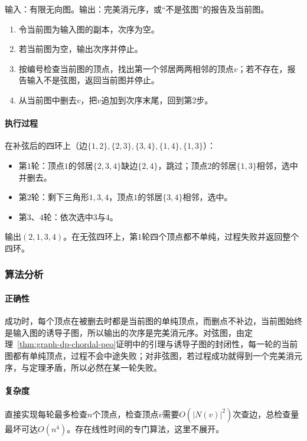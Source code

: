 \begin{algorithm}[逐次删除单纯顶点]
\label{alg:graph-dp-peo-construction}
输入：有限无向图。输出：完美消元序，或“不是弦图”的报告及当前图。
\begin{enumerate}
  \item 令当前图为输入图的副本，次序为空。
  \item 若当前图为空，输出次序并停止。
  \item 按编号检查当前图的顶点，找出第一个邻居两两相邻的顶点$v$；若不存在，报告输入不是弦图，返回当前图并停止。
  \item 从当前图中删去$v$，把$v$追加到次序末尾，回到第2步。
\end{enumerate}
\end{algorithm}

\paragraph{执行过程}
在补弦后的四环上（边$\{1,2\},\allowbreak\{2,3\},\allowbreak\{3,4\},\allowbreak\{1,4\},\allowbreak\{1,3\}$）：
\begin{itemize}
  \item 第$1$轮：顶点$1$的邻居$\{2,3,4\}$缺边$\{2,4\}$，跳过；顶点$2$的邻居$\{1,3\}$相邻，选中并删去。
  \item 第$2$轮：剩下三角形$1,3,4$，顶点$1$的邻居$\{3,4\}$相邻，选中。
  \item 第$3$、$4$轮：依次选中$3$与$4$。
\end{itemize}
输出$(2,1,3,4)$。在无弦四环上，第$1$轮四个顶点都不单纯，过程失败并返回整个四环。

\subsubsection{算法分析}

\paragraph{正确性}
成功时，每个顶点在被删去时都是当前图的单纯顶点，而删点不补边，当前图始终是输入图的诱导子图，所以输出的次序是完美消元序。对弦图，由定理~\ref{thm:graph-dp-chordal-peo}证明中的引理与诱导子图的封闭性，每一轮的当前图都有单纯顶点，过程不会中途失败；对非弦图，若过程成功就得到一个完美消元序，与定理矛盾，所以必然在某一轮失败。

\paragraph{复杂度}
直接实现每轮最多检查$n$个顶点，检查顶点$v$需要$O(|N(v)|^2)$次查边，总检查量最坏可达$O(n^4)$。存在线性时间的专门算法，这里不展开。

